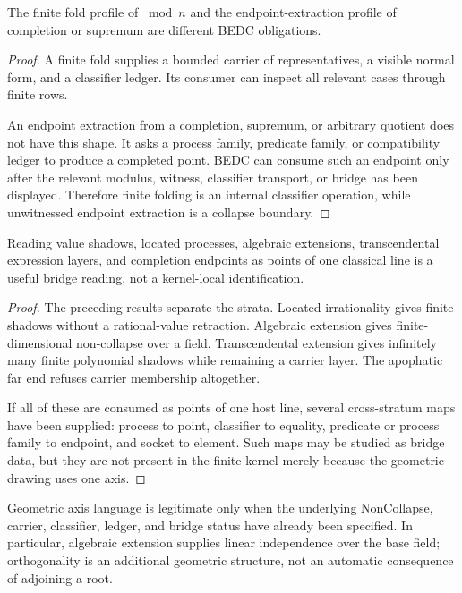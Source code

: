 \begin{theorem}
\label{thm:operation-profiles-separate-folds-collapses}
The finite fold profile of $\bmod n$ and the endpoint-extraction profile of
completion or supremum are different BEDC obligations.
\end{theorem}

\begin{proof}
A finite fold supplies a bounded carrier of representatives, a visible
normal form, and a classifier ledger.  Its consumer can inspect all relevant
cases through finite rows.

An endpoint extraction from a completion, supremum, or arbitrary quotient
does not have this shape.  It asks a process family, predicate family, or
compatibility ledger to produce a completed point.  BEDC can consume such an
endpoint only after the relevant modulus, witness, classifier transport, or
\NameCert{} bridge has been displayed.  Therefore finite folding is an
internal classifier operation, while unwitnessed endpoint extraction is a
collapse boundary.
\end{proof}

\begin{theorem}
\label{thm:classical-point-line-reading-is-bridge}
Reading value shadows, located processes, algebraic extensions,
transcendental expression layers, and completion endpoints as points of one
classical line is a useful bridge reading, not a kernel-local identification.
\end{theorem}

\begin{proof}
The preceding results separate the strata.  Located irrationality gives
finite shadows without a rational-value retraction.  Algebraic extension
gives finite-dimensional non-collapse over a field.  Transcendental
extension gives infinitely many finite polynomial shadows while remaining a
carrier layer.  The apophatic far end refuses carrier membership altogether.

If all of these are consumed as points of one host line, several
cross-stratum maps have been supplied: process to point, classifier to
equality, predicate or process family to endpoint, and socket to element.
Such maps may be studied as bridge data, but they are not present in the
finite kernel merely because the geometric drawing uses one axis.
\end{proof}

\begin{corollary}
\label{cor:axis-prose-subordinate-to-noncollapse}
Geometric axis language is legitimate only when the underlying
NonCollapse, carrier, classifier, ledger, and bridge status have already
been specified.  In particular, algebraic extension supplies linear
independence over the base field; orthogonality is an additional geometric
structure, not an automatic consequence of adjoining a root.
\end{corollary}


